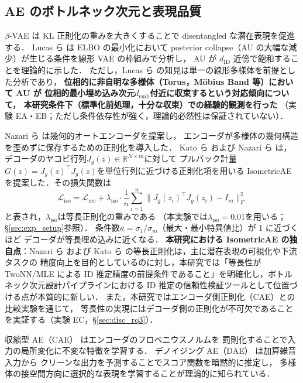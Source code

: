 \documentclass[12pt,a4paper]{jsarticle}
\newcommand{\Jg}{J_g}
\newcommand{\R}{\mathbb{R}}
\newcommand{\kap}{\kappa}
\newcommand{\demb}{d_{\mathrm{emb}}}
\begin{document}
\subsection{AE のボトルネック次元と表現品質}

$\beta$-VAE\cite{higgins2017betavae} は KL 正則化の重みを大きくすることで
disentangled な潜在表現を促進する．
Lucas ら\cite{lucas2019elbo} は ELBO の最小化において
posterior collapse（AU の大幅な減少）が生じる条件を線形 VAE の枠組みで分析し，
AU が $d_{\mathrm{ID}}$ 近傍で飽和することを理論的に示した．
ただし，Lucas ら\cite{lucas2019elbo} の知見は単一の線形多様体を前提とした分析であり，
\textbf{位相的に非自明な多様体（Torus，Möbius Band 等）において AU が
位相的最小埋め込み次元$\demb$付近に収束するという対応傾向について，
本研究条件下（標準化前処理，十分な収束）での経験的観測を行った}
（実験 EA・EB；ただし条件依存性が強く，理論的必然性は保証されていない）．

Nazari ら\cite{nazari2023geometric} は幾何的オートエンコーダを提案し，
エンコーダが多様体の幾何構造を歪めずに保存するための正則化を導入した．
Kato ら\cite{kato2020rdae} および Nazari ら\cite{nazari2023geometric} は，
デコーダのヤコビ行列$\Jg(z) \in \R^{N \times m}$に対して
プルバック計量$G(z) = \Jg(z)^\top \Jg(z)$を単位行列に近づける正則化項を用いる
IsometricAE を提案した．その損失関数は
\begin{equation}
  \mathcal{L}_{\mathrm{iso}} = \mathcal{L}_{\mathrm{rec}}
  + \lambda_{\mathrm{iso}} \cdot \frac{1}{n}\sum_{i=1}^{n}
    \|\Jg(z_i)^\top \Jg(z_i) - I_m\|_F^2
  \label{eq:iso_loss}
\end{equation}
と表され，$\lambda_{\mathrm{iso}}$は等長正則化の重みである
（本実験では$\lambda_{\mathrm{iso}} = 0.01$を用いる；§\ref{sec:exp_setup}参照）．
条件数$\kap = \sigma_1/\sigma_m$（最大・最小特異値比）が 1 に近づくほど
デコーダが等長埋め込みに近くなる．
\textbf{本研究における IsometricAE の独自点}：Nazari ら\cite{nazari2023geometric} および
Kato ら\cite{kato2020rdae} の等長正則化は，主に潜在表現の可視化や下流タスクの
精度向上を目的としているのに対し，本研究では「等長性が TwoNN/MLE による
ID 推定精度の前提条件であること」を明確化し，ボトルネック次元設計パイプラインにおける
ID 推定の信頼性検証ツールとして位置づける点が本質的に新しい．
また，本研究ではエンコーダ側正則化（CAE）との比較実験を通じて，
等長性の実現にはデコーダ側の正則化が不可欠であることを実証する（実験 EC，§\ref{sec:disc_rq3}）．

収縮型 AE（CAE）\cite{rifai2011cae} はエンコーダのフロベニウスノルムを
罰則化することで入力の局所変化に不変な特徴を学習する．
デノイジング AE（DAE）\cite{alain2014dae} は加算雑音入力から
クリーンな出力を予測することでスコア関数を暗黙的に推定し，
多様体の接空間方向に選択的な表現を学習することが理論的に知られている．
\end{document}
